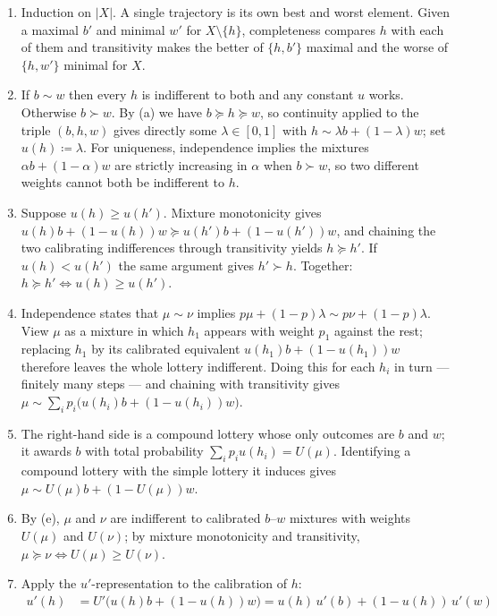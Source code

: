 \documentclass[11pt]{article}
\newcommand{\pref}{\succcurlyeq}
\newcommand{\strictpref}{\succ}
\newcommand{\indiff}{\sim}
\begin{document}
\begin{solution}
\begin{enumerate}[label=(\alph*)]
\item Induction on $|X|$. A single trajectory is its own best and worst
element. Given a maximal $b'$ and minimal $w'$ for $X\setminus\{h\}$,
completeness compares $h$ with each of them and transitivity makes the
better of $\{h,b'\}$ maximal and the worse of $\{h,w'\}$ minimal for $X$.
\item If $b\indiff w$ then every $h$ is indifferent to both and any constant
$u$ works. Otherwise $b\strictpref w$. By (a) we have $b\pref h\pref w$, so
continuity applied to the triple $(b,h,w)$ gives directly some
$\lambda\in[0,1]$ with $h\indiff \lambda b+(1-\lambda)w$; set
$u(h)\coloneqq\lambda$. For uniqueness, independence implies the mixtures
$\alpha b+(1-\alpha)w$ are strictly increasing in $\alpha$ when
$b\strictpref w$, so two different weights cannot both be indifferent to
$h$.
\item Suppose $u(h)\geq u(h')$. Mixture monotonicity gives
$u(h)b+(1-u(h))w \pref u(h')b+(1-u(h'))w$, and chaining the two calibrating
indifferences through transitivity yields $h\pref h'$. If $u(h)<u(h')$ the
same argument gives $h'\strictpref h$. Together:
$h\pref h'\iff u(h)\geq u(h')$.
\item Independence states that $\mu\indiff\nu$ implies
$p\mu+(1-p)\lambda \indiff p\nu+(1-p)\lambda$. View $\mu$ as a mixture in
which $h_1$ appears with weight $p_1$ against the rest; replacing $h_1$ by
its calibrated equivalent $u(h_1)b+(1-u(h_1))w$ therefore leaves the whole
lottery indifferent. Doing this for each $h_i$ in turn — finitely many
steps — and chaining with transitivity gives
$\mu\indiff\sum_i p_i\bigl(u(h_i)b+(1-u(h_i))w\bigr)$.
\item The right-hand side is a compound lottery whose only outcomes are $b$
and $w$; it awards $b$ with total probability $\sum_i p_i u(h_i)=U(\mu)$.
Identifying a compound lottery with the simple lottery it induces gives
$\mu\indiff U(\mu)b+(1-U(\mu))w$.
\item By (e), $\mu$ and $\nu$ are indifferent to calibrated $b$--$w$
mixtures with weights $U(\mu)$ and $U(\nu)$; by mixture monotonicity and
transitivity, $\mu\pref\nu\iff U(\mu)\geq U(\nu)$.
\item Apply the $u'$-representation to the calibration of $h$:
\begin{align*}
u'(h)&=U'\bigl(u(h)b+(1-u(h))w\bigr)=u(h)\,u'(b)+(1-u(h))\,u'(w) \\

\end{align*}
\end{enumerate}
\end{solution}
\end{document}

